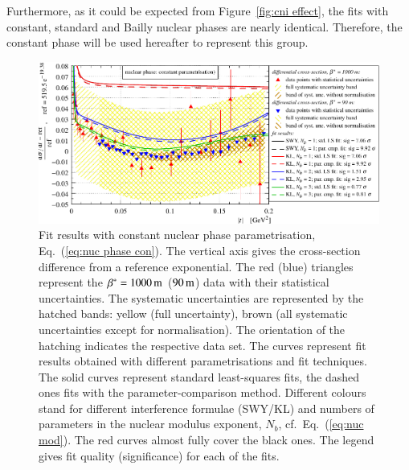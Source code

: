 Furthermore, as it could be expected from Figure~\ref{fig:cni effect}, the fits with constant, standard and Bailly nuclear phases are nearly identical. Therefore, the constant phase will be used hereafter to represent this group.


\begin{figure}
\begin{center}
\includegraphics{fig/fits_common_con.pdf}
\caption{%
Fit results with constant nuclear phase parametrisation, Eq.~(\ref{eq:nuc phase con}). The vertical axis gives the cross-section difference from a reference exponential. The red (blue) triangles represent the $\beta^* = 1000\,{\rm m}$ ($90\,{\rm m}$) data with their statistical uncertainties. The systematic uncertainties are represented by the hatched bands: yellow (full uncertainty), brown (all systematic uncertainties except for normalisation). The orientation of the hatching indicates the respective data set.
The curves represent fit results obtained with different parametrisations and fit techniques. The solid curves represent standard least-squares fits, the dashed ones fits with the parameter-comparison method. Different colours stand for different interference formulae (SWY/KL) and numbers of parameters in the nuclear modulus exponent, $N_b$, cf.~Eq.~(\ref{eq:nuc mod}). The red curves almost fully cover the black ones. The legend gives fit quality (significance) for each of the fits.
}
\label{fig:fits common con}
\end{center}
\end{figure}

